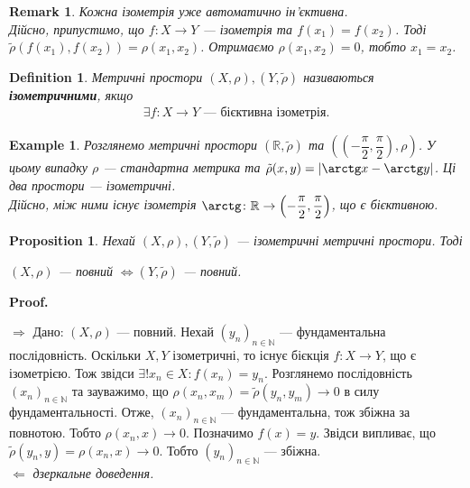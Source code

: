 \documentclass[a4paper, 10pt]{article}
\makeatletter
\def\rightproof{$\boxed{\Rightarrow}$ }
\def\leftproof{$\boxed{\Leftarrow}$ }
\theoremstyle{theoremdd}
\theoremstyle{theoremdd}
\newtheorem{definition}[theorem]{Definition}
\theoremstyle{theoremdd}
\theoremstyle{theoremdd}
\newtheorem{example}[theorem]{Example}
\theoremstyle{theoremdd}
\newtheorem{proposition}[theorem]{Proposition}
\theoremstyle{theoremdd}
\newtheorem{remark}[theorem]{Remark}
\theoremstyle{theoremdd}
\theoremstyle{theoremdd}
\renewenvironment{proof}[1][Proof.\\]{\par
\pushQED{\hfill \qed}%
\normalfont \topsep6\p@\@plus6\p@\relax
\trivlist
\item\relax
{\bfseries
#1\@addpunct{.}}\hspace\labelsep\ignorespaces
}{%
\popQED\endtrivlist\@endpefalse
}
\makeatother
\begin{document}
\begin{remark}
Кожна ізометрія уже автоматично ін'єктивна.\\
Дійсно, припустимо, що $f \colon X \to Y$ --- ізометрія та $f(x_1) = f(x_2)$. Тоді $\tilde{\rho}(f(x_1),f(x_2)) = \rho(x_1,x_2)$. Отримаємо $\rho(x_1,x_2) = 0$, тобто $x_1 = x_2$.
\end{remark}

\begin{definition}
Метричні простори $(X,\rho), (Y,\tilde{\rho})$ називаються \textbf{ізометричними}, якщо
\begin{align*}
\exists f \colon X \to Y \text{ --- бієктивна ізометрія}.
\end{align*}
\end{definition}

\begin{example}
Розглянемо метричні простори $(\mathbb{R}, \tilde{\rho})$ та $\left( \left( -\dfrac{\pi}{2}, \dfrac{\pi}{2} \right), \rho \right)$. У цьому випадку $\rho$ --- стандартна метрика та $\tilde{\rho}(x,y) = |\arctg x - \arctg y|$. Ці два простори --- ізометричні.\\
Дійсно, між ними існує ізометрія $\arctg \colon \mathbb{R} \to \left( -\dfrac{\pi}{2}, \dfrac{\pi}{2} \right)$, що є бієктивною.
\end{example}

\begin{proposition}
Нехай $(X,\rho), (Y, \tilde{\rho})$ --- ізометричні метричні простори. Тоді
\begin{center}
$(X,\rho)$ --- повний $\iff (Y,\tilde{\rho})$ --- повний.
\end{center}
\end{proposition}

\begin{proof}
\rightproof Дано: $(X,\rho)$ --- повний. Нехай $(y_n)_{n \in \mathbb{N}}$ --- фундаментальна послідовність. Оскільки $X,Y$ ізометричні, то існує бієкція $f \colon X \to Y$, що є ізометрією. Тож звідси $\exists !x_n \in X: f(x_n) = y_n$. Розглянемо послідовність $(x_n)_{n \in \mathbb{N}}$ та зауважимо, що $\rho(x_n,x_m) = \tilde{\rho}(y_n,y_m) \to 0$ в силу фундаментальності. Отже, $(x_n)_{n \in \mathbb{N}}$ --- фундаментальна, тож збіжна за повнотою. Тобто $\rho(x_n,x) \to 0$. Позначимо $f(x) = y$. Звідси випливає, що $\tilde{\rho}(y_n,y) = \rho(x_n,x) \to 0$. Тобто $(y_n)_{n \in \mathbb{N}}$ --- збіжна.
\bigskip \\
\leftproof \textit{дзеркальне доведення.}
\end{proof}
\end{document}
